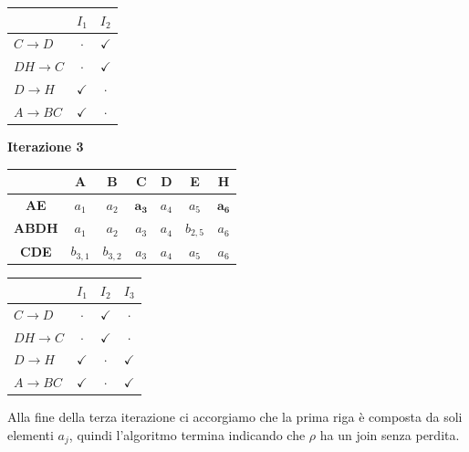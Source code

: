 \begin{exmp}
\begin{multicols}{2}
  \begin{center}
  \begin{tabular}{l|c|c}
   & $I_1$ & $I_2$\\
   \hline
   $C\rightarrow D$& $\cdot$ & $\checkmark$\\
   $DH\rightarrow C$& $\cdot$& $\checkmark$\\
   $D \rightarrow H$& $\checkmark$ & $\cdot$\\
   $A \rightarrow BC$& $\checkmark$ & $\cdot$
  \end{tabular}
 \end{center}
 \end{multicols}
\textbf{Iterazione 3}
 \begin{multicols}{2}
   \begin{center}
  \begin{tabular}{c|c|c|c|c|c|c}
    & \textbf{A} & \textbf{B} &\textbf{C}&\textbf{D}&\textbf{E}&\textbf{H}\\
   \hline
   \textbf{AE} & $a_1$ & $a_2$ & $\mathbf{a_3}$ & $a_4$ & $a_5$ & $\mathbf{a_6}$\\
   \hline
   \textbf{ABDH}& $a_1$ & $a_2$ & $a_3$ & $a_4$ & $b_{2,5}$ & $a_6$\\
   \hline
   \textbf{CDE} & $b_{3,1}$ & $b_{3,2}$ & $a_3$ & $a_4$ & $a_5$ & $a_6$
  \end{tabular}
 \end{center}
 
  \begin{center}
  \begin{tabular}{l|c|c|c}
   & $I_1$ & $I_2$ & $I_3$\\
   \hline
   $C\rightarrow D$& $\cdot$ & $\checkmark$ & $\cdot$\\
   $DH\rightarrow C$& $\cdot$& $\checkmark$ & $\cdot$\\
   $D \rightarrow H$& $\checkmark$ & $\cdot$ & $\checkmark$\\
   $A \rightarrow BC$& $\checkmark$ & $\cdot$ & $\checkmark$\\
  \end{tabular}
 \end{center}
 \end{multicols}
\noindent Alla fine della terza iterazione ci accorgiamo che la prima riga è composta da soli elementi $a_j$, quindi l'algoritmo
termina indicando che $\rho$ ha un join senza perdita.
 \end{exmp}


